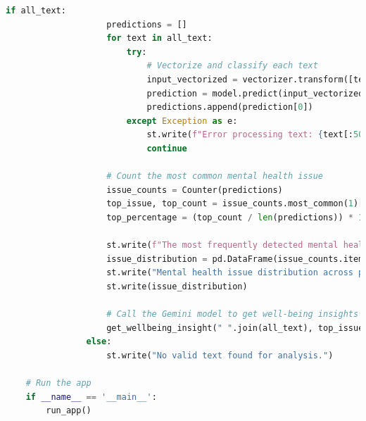         \begin{tcolorbox}[colback=gray!5!white, colframe=gray!80!black, boxrule=0.5pt, title=Streamlit Mental Health Disorder Detection App]        
            \begin{lstlisting}[language=Python]
                if all_text:
                    predictions = []
                    for text in all_text:
                        try:
                            # Vectorize and classify each text
                            input_vectorized = vectorizer.transform([text])
                            prediction = model.predict(input_vectorized)
                            predictions.append(prediction[0])
                        except Exception as e:
                            st.write(f"Error processing text: {text[:50]}... - {e}")
                            continue
    
                    # Count the most common mental health issue
                    issue_counts = Counter(predictions)
                    top_issue, top_count = issue_counts.most_common(1)[0]
                    top_percentage = (top_count / len(predictions)) * 100
    
                    st.write(f"The most frequently detected mental health concern is: {top_issue}, appearing in {top_percentage:.2f}% of analyzed text.")
                    issue_distribution = pd.DataFrame(issue_counts.items(), columns=['Mental Health Issue', 'Count'])
                    st.write("Mental health issue distribution across posts:")
                    st.write(issue_distribution)
    
                    # Call the Gemini model to get well-being insights
                    get_wellbeing_insight(" ".join(all_text), top_issue)
                else:
                    st.write("No valid text found for analysis.")

    # Run the app
    if __name__ == '__main__':
        run_app()


    \end{lstlisting}
    \end{tcolorbox}

